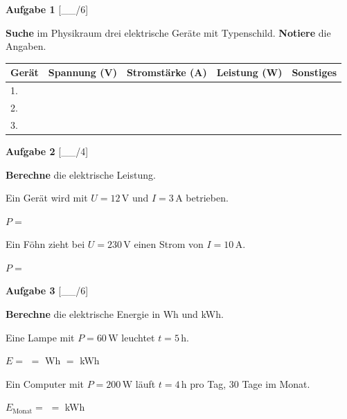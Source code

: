 \documentclass[11pt, a4paper]{article}
\newif\ifzeigesternchen
\newcommand{\luecke}[1]{\underline{\hspace{#1}}}
\newcommand{\punktebox}[1]{\hfill\small\textcolor{mittelgrau}{[\_\_/#1]}}
\newcommand{\stern}[1]{\ifzeigesternchen\textsuperscript{\textcolor{fachfarbe}{(#1)}}\fi}
\newcommand{\aufgabe}[2]{%
    \needspace{4\baselineskip}%
    \vspace{10pt}%
    \noindent\textbf{\textcolor{fachfarbe}{Aufgabe #1}} #2%
    \vspace{4pt}%
    \nopagebreak[4]%
}
\newcommand{\operator}[1]{\textbf{\textcolor{fachfarbe}{#1}}}
\newcommand{\ein}[1]{\,\mathrm{#1}}
\begin{document}

\aufgabe{1}{\stern{*}} \punktebox{6}

\operator{Suche} im Physikraum drei elektrische Geräte mit Typenschild. \operator{Notiere} die Angaben.

\vspace{0.3em}
\renewcommand{\arraystretch}{1.6}
\begin{tabularx}{\linewidth}{|p{3.5cm}|X|X|X|X|}
\hline
\textbf{Gerät} & \textbf{Spannung (V)} & \textbf{Stromstärke (A)} & \textbf{Leistung (W)} & \textbf{Sonstiges} \\
\hline
1. & & & & \\
\hline
2. & & & & \\
\hline
3. & & & & \\
\hline
\end{tabularx}
\renewcommand{\arraystretch}{1.0}


\aufgabe{2}{\stern{*}} \punktebox{4}

\operator{Berechne} die elektrische Leistung.

\begin{teil}
    \item Ein Gerät wird mit $U = 12\ein{V}$ und $I = 3\ein{A}$ betrieben.

    \vspace{1.5em}
    \hfill $P = $ \luecke{2cm}

    \item Ein Föhn zieht bei $U = 230\ein{V}$ einen Strom von $I = 10\ein{A}$.

    \vspace{1.5em}
    \hfill $P = $ \luecke{2cm}
\end{teil}


\aufgabe{3}{\stern{**}} \punktebox{6}

\operator{Berechne} die elektrische Energie in Wh und kWh.

\begin{teil}
    \item Eine Lampe mit $P = 60\ein{W}$ leuchtet $t = 5\ein{h}$.

    \vspace{2em}
    $E = $ \luecke{3cm} $= $ \luecke{2cm} Wh $= $ \luecke{2cm} kWh

    \item Ein Computer mit $P = 200\ein{W}$ läuft $t = 4\ein{h}$ pro Tag, 30 Tage im Monat.

    \vspace{2.5em}
    $E_{\text{Monat}} = $ \luecke{6cm} $= $ \luecke{2cm} kWh
\end{teil}
\end{document}
